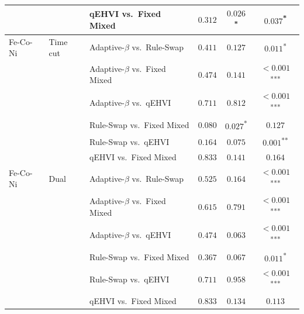 \begin{tabular}{lllccc}
 &  & qEHVI vs.\ Fixed Mixed & $0.312$ & $0.026$\textsuperscript{*} & $0.037$\textsuperscript{*} \\
\midrule
Fe-Co-Ni & Time cut & Adaptive-$\beta$ vs.\ Rule-Swap & $0.411$ & $0.127$ & $0.011$\textsuperscript{*} \\
 &  & Adaptive-$\beta$ vs.\ Fixed Mixed & $0.474$ & $0.141$ & $<0.001$\textsuperscript{***} \\
 &  & Adaptive-$\beta$ vs.\ qEHVI & $0.711$ & $0.812$ & $<0.001$\textsuperscript{***} \\
 &  & Rule-Swap vs.\ Fixed Mixed & $0.080$ & $0.027$\textsuperscript{*} & $0.127$ \\
 &  & Rule-Swap vs.\ qEHVI & $0.164$ & $0.075$ & $0.001$\textsuperscript{**} \\
 &  & qEHVI vs.\ Fixed Mixed & $0.833$ & $0.141$ & $0.164$ \\
\midrule
Fe-Co-Ni & Dual & Adaptive-$\beta$ vs.\ Rule-Swap & $0.525$ & $0.164$ & $<0.001$\textsuperscript{***} \\
 &  & Adaptive-$\beta$ vs.\ Fixed Mixed & $0.615$ & $0.791$ & $<0.001$\textsuperscript{***} \\
 &  & Adaptive-$\beta$ vs.\ qEHVI & $0.474$ & $0.063$ & $<0.001$\textsuperscript{***} \\
 &  & Rule-Swap vs.\ Fixed Mixed & $0.367$ & $0.067$ & $0.011$\textsuperscript{*} \\
 &  & Rule-Swap vs.\ qEHVI & $0.711$ & $0.958$ & $<0.001$\textsuperscript{***} \\
 &  & qEHVI vs.\ Fixed Mixed & $0.833$ & $0.134$ & $0.113$ \\
\bottomrule
\end{tabular}

